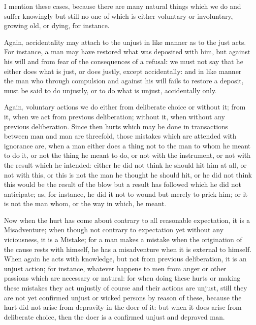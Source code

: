 I mention these cases, because there are many natural things which we do and
suffer knowingly but still no one of which is either voluntary or involuntary,
growing old, or dying, for instance.

Again, accidentality may attach to the unjust in like manner as to the just
acts. For instance, a man may have restored what was deposited with him, but
against his will and from fear of the consequences of a refusal: we must not
say that he either does what is just, or does justly, except accidentally: and
in like manner the man who through compulsion and against his will fails to
restore a deposit, must be said to do unjustly, or to do what is unjust,
accidentally only.

Again, voluntary actions we do either from deliberate choice or without it;
from it, when we act from previous deliberation; without it, when without any
previous deliberation. Since then hurts which may be done in transactions
between man and man are threefold, those mistakes which are attended with
ignorance are, when a man either does a thing not to the man to whom he meant
to do it, or not the thing he meant to do, or not with the instrument, or not
with the result which he intended: either he did not think he should hit him at
all, or not with this, or this is not the man he thought he should hit, or he
did not think this would be the result of the blow but a result has followed
which he did not anticipate; as, for instance, he did it not to wound but
merely to prick him; or it is not the man whom, or the way in which, he meant.

Now when the hurt has come about contrary to all reasonable expectation, it is
a Misadventure; when though not contrary to expectation yet without any
viciousness, it is a Mistake; for a man makes a mistake when the origination of
the cause rests with himself, he has a misadventure when it is external to
himself. When again he acts with knowledge, but not from previous deliberation,
it is an unjust action; for instance, whatever happens to men from anger or
other passions which are necessary or natural: for when doing these hurts or
making these mistakes they act unjustly of course and their actions are unjust,
still they are not yet confirmed unjust or wicked persons by reason of these,
because the hurt did not arise from depravity in the doer of it: but when it
does arise from deliberate choice, then the doer is a confirmed unjust and
depraved man.

